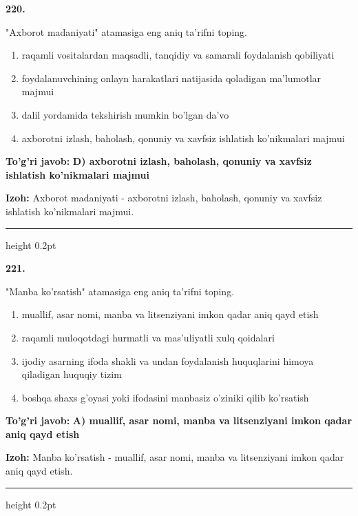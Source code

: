 \documentclass[10pt,a4paper,oneside]{article}
\begin{document}
\noindent\textbf{\color{ink}220.}
\par
"Axborot madaniyati" atamasiga eng aniq ta'rifni toping.
\begin{enumerate}[label=\Alph*),leftmargin=9mm]
\item raqamli vositalardan maqsadli, tanqidiy va samarali foydalanish qobiliyati
\item foydalanuvchining onlayn harakatlari natijasida qoladigan ma'lumotlar majmui
\item dalil yordamida tekshirish mumkin bo'lgan da'vo
\item axborotni izlash, baholash, qonuniy va xavfsiz ishlatish ko'nikmalari majmui
\end{enumerate}
\begin{tcolorbox}[enhanced,breakable,colback=teal!4,colframe=teal!50!black,boxrule=0.5pt,arc=1.1mm,left=3mm,right=3mm,top=1.7mm,bottom=1.7mm,before skip=2mm,after skip=2mm]
\textbf{\color{teal}To'g'ri javob:} \textbf{D) axborotni izlash, baholash, qonuniy va xavfsiz ishlatish ko'nikmalari majmui}
\par\smallskip
\textbf{Izoh:} Axborot madaniyati - axborotni izlash, baholash, qonuniy va xavfsiz ishlatish ko'nikmalari majmui.
\end{tcolorbox}
\vspace{2mm}\hrule height 0.2pt \vspace{3mm}

\noindent\textbf{\color{ink}221.}
\par
"Manba ko'rsatish" atamasiga eng aniq ta'rifni toping.
\begin{enumerate}[label=\Alph*),leftmargin=9mm]
\item muallif, asar nomi, manba va litsenziyani imkon qadar aniq qayd etish
\item raqamli muloqotdagi hurmatli va mas'uliyatli xulq qoidalari
\item ijodiy asarning ifoda shakli va undan foydalanish huquqlarini himoya qiladigan huquqiy tizim
\item boshqa shaxs g'oyasi yoki ifodasini manbasiz o'ziniki qilib ko'rsatish
\end{enumerate}
\begin{tcolorbox}[enhanced,breakable,colback=teal!4,colframe=teal!50!black,boxrule=0.5pt,arc=1.1mm,left=3mm,right=3mm,top=1.7mm,bottom=1.7mm,before skip=2mm,after skip=2mm]
\textbf{\color{teal}To'g'ri javob:} \textbf{A) muallif, asar nomi, manba va litsenziyani imkon qadar aniq qayd etish}
\par\smallskip
\textbf{Izoh:} Manba ko'rsatish - muallif, asar nomi, manba va litsenziyani imkon qadar aniq qayd etish.
\end{tcolorbox}
\vspace{2mm}\hrule height 0.2pt \vspace{3mm}
\end{document}

